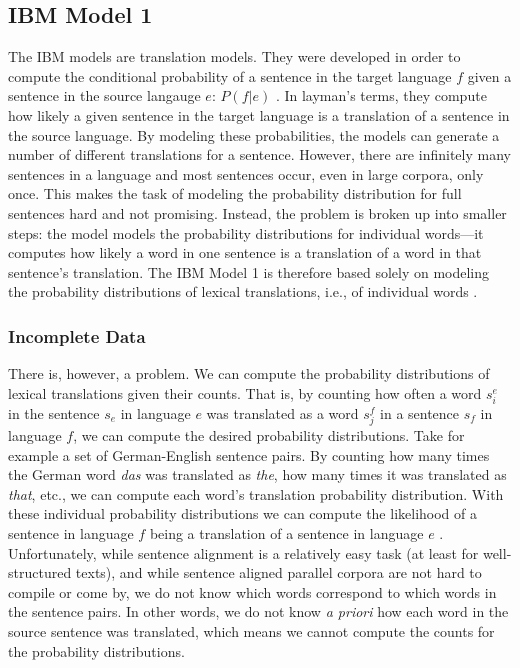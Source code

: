 \subsection{IBM Model 1}
\label{sec:ibm-model-1}
The IBM models are translation models. 
They were developed in order to compute the conditional probability of a sentence in the target language $f$ given a sentence in the source langauge $e$: $P(f|e)$ \autocite{brown-etal-1993-mathematics}. 
In layman's terms, they compute how likely a given sentence in the target language is a translation of a sentence in the source language.
By modeling these probabilities, the models can generate a number of different translations for a sentence. 
However, there are infinitely many sentences in a language and most sentences occur, even in large corpora, only once. 
This makes the task of modeling the probability distribution for full sentences hard and not promising. 
Instead, the problem is broken up into smaller steps: the model models the probability distributions for individual words---it computes how likely a word in one sentence is a translation of a word in that sentence's translation. 
The IBM Model 1 is therefore based solely on modeling the probability distributions of lexical translations, i.e., of individual words \autocite[88]{koehn2009}.

\subsubsection{Incomplete Data}
There is, however, a problem. 
We can compute the probability distributions of lexical translations given their counts. 
That is, by counting how often a word $s^e_i$ in the sentence $s_e$ in language $e$ was translated as a word $s^f_j$ in a sentence $s_f$ in language $f$, we can compute the desired probability distributions. 
Take for example a set of German-English sentence pairs. By counting how many times the German word \emph{das} was translated as \emph{the}, how many times it was translated as \emph{that}, etc., we can compute each word's translation probability distribution. 
With these individual probability distributions we can compute the likelihood of a sentence in language $f$ being a translation of a sentence in language $e$ \autocite[88]{koehn2009}.
Unfortunately, while sentence alignment is a relatively easy task (at least for well-structured texts), and while sentence aligned parallel corpora are not hard to compile or come by, we do not know which words correspond to which words in the sentence pairs. In other words, we do not know \emph{a priori} how each word in the source sentence was translated, which means we cannot compute the counts for the probability distributions.

